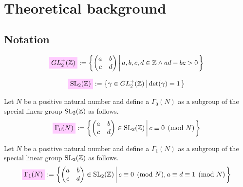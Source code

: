 \documentclass{article}
\begin{document}


\section{Theoretical background}

\subsection{Notation}

\begin{gather}
  \defineNotation[GL2+Z]{GL_2^+(\setZ)}
  :=
  \SetDef{  \begin{pmatrix}
    a & b\\
    c & d
  \end{pmatrix}}{a,b,c,d\in\setZ \land ad-bc>0}
  \label{eq:GL2+Z}
\end{gather}

\begin{gather}
  \defineNotation[SL2Z]{\SL2Z} := \SetDef{\gamma\in
    GL_2^+(\setZ)}{\det(\gamma)=1}
  \label{eq:SL2Z}
\end{gather}

Let $N$ be a positive natural number and define a $\Gamma_0(N)$ as a
subgroup of the special linear group $\SL2Z$ as follows.
\begin{gather}
\defineNotation[Gamma0N]{\Gamma_0(N)} := \SetDef{  \begin{pmatrix}
    a & b\\
    c & d
  \end{pmatrix} \in \SL2Z}{c \equiv 0 \pmod{N}}
  \label{eq:Gamma0}
\end{gather}

Let $N$ be a positive natural number and define a $\Gamma_1(N)$ as a
subgroup of the special linear group $\SL2Z$ as follows.
\begin{gather}
\defineNotation[Gamma1N]{\Gamma_1(N)} := \SetDef{  \begin{pmatrix}
    a & b\\
    c & d
  \end{pmatrix} \in \SL2Z}{c\equiv0 \pmod{N}, a\equiv d\equiv1 \pmod{N}}
  \label{eq:Gamma1}
\end{gather}
\end{document}
